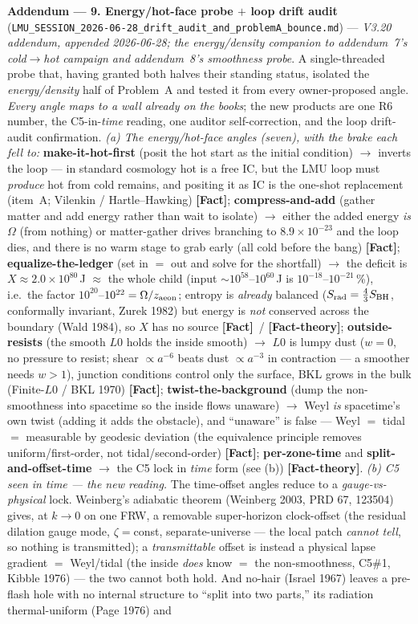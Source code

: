 \documentclass[11pt]{article}
\newcommand{\Fact}{\textbf{\textcolor{green!45!black}{[Fact]}}}
\newcommand{\fact}{\textcolor{green!40!black}{\textbf{[Fact]}}}
\newcommand{\factth}{\textcolor{green!40!black}{\textbf{[Fact-theory]}}}
\begin{document}
\smallskip\noindent\textbf{Addendum --- 9. Energy/hot-face probe $+$ loop drift audit} (\texttt{LMU\_SESSION\_2026-06-28\_drift\_audit\_and\_problemA\_bounce.md}) --- \emph{V3.20 addendum, appended 2026-06-28; the energy/density companion to addendum~7's cold$\to$hot campaign and addendum~8's smoothness probe}. A single-threaded probe that, having granted both halves their standing status, isolated the \emph{energy/density} half of Problem~A and tested it from every owner-proposed angle. \emph{Every angle maps to a wall already on the books}; the new products are one R6 number, the C5-in-\emph{time} reading, one auditor self-correction, and the loop drift-audit confirmation. \emph{(a) The energy/hot-face angles (seven), with the brake each fell to:} \textbf{make-it-hot-first} (posit the hot start as the initial condition) $\to$ inverts the loop --- in standard cosmology hot is a free IC, but the LMU loop must \emph{produce} hot from cold remains, and positing it as IC is the one-shot replacement (item~A; Vilenkin / Hartle--Hawking) \Fact; \textbf{compress-and-add} (gather matter and add energy rather than wait to isolate) $\to$ either the added energy \emph{is} $\Omega$ (from nothing) or matter-gather drives branching to $8.9\times10^{-23}$ and the loop dies, and there is no warm stage to grab early (all cold before the bang) \Fact; \textbf{equalize-the-ledger} (set in $=$ out and solve for the shortfall) $\to$ the deficit is $X\approx2.0\times10^{80}$\,J $\approx$ the whole child (input $\sim10^{58}$--$10^{60}$\,J is $10^{-18}$--$10^{-21}$\,\%), i.e.\ the factor $10^{20}$--$10^{22}=\Omega/z_{\rm aeon}$; entropy is \emph{already} balanced ($S_{\rm rad}=\tfrac43 S_{\rm BH}$, conformally invariant, Zurek 1982) but energy is \emph{not} conserved across the boundary (Wald 1984), so $X$ has no source \fact\ / \factth; \textbf{outside-resists} (the smooth $L0$ holds the inside smooth) $\to$ $L0$ is lumpy dust ($w=0$, no pressure to resist; shear $\propto a^{-6}$ beats dust $\propto a^{-3}$ in contraction --- a smoother needs $w>1$), junction conditions control only the surface, BKL grows in the bulk (Finite-$L0$ / BKL 1970) \Fact; \textbf{twist-the-background} (dump the non-smoothness into spacetime so the inside flows unaware) $\to$ Weyl \emph{is} spacetime's own twist (adding it adds the obstacle), and ``unaware'' is false --- Weyl $=$ tidal $=$ measurable by geodesic deviation (the equivalence principle removes uniform/first-order, not tidal/second-order) \Fact; \textbf{per-zone-time} and \textbf{split-and-offset-time} $\to$ the C5 lock in \emph{time} form (see (b)) \factth. \emph{(b) C5 seen in time --- the new reading.} The time-offset angles reduce to a \emph{gauge-vs-physical} lock. Weinberg's adiabatic theorem (Weinberg 2003, PRD 67, 123504) gives, at $k\to0$ on one FRW, a removable super-horizon clock-offset (the residual dilation gauge mode, $\zeta=$const, separate-universe --- the local patch \emph{cannot tell}, so nothing is transmitted); a \emph{transmittable} offset is instead a physical lapse gradient $=$ Weyl/tidal (the inside \emph{does} know $=$ the non-smoothness, C5\#1, Kibble 1976) --- the two cannot both hold. And no-hair (Israel 1967) leaves a pre-flash hole with no internal structure to ``split into two parts,'' its radiation thermal-uniform (Page 1976) and 
\end{document}
